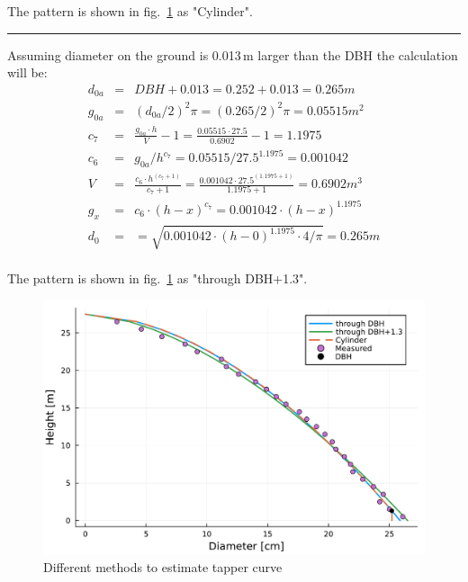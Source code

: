 \documentclass[twocolumn,10pt]{article}
\begin{document}
The pattern is shown in fig.~\ref{fig:trunk} as "Cylinder".

\par\noindent\rule{\columnwidth}{0.5pt}

Assuming diameter on the ground is 0.013\,m larger than the DBH the calculation
will be:
\begin{eqnarray*}
d_{0a} & = & DBH + 0.013 = 0.252 + 0.013 = 0.265m\\
g_{0a} & = & (d_{0a}/2)^2\pi = (0.265/2)^2\pi = 0.05515m^2\\
c_7 & = & \frac{g_{0a} \cdot h}{V} - 1 = \frac{0.05515 \cdot 27.5}{0.6902} - 1 = 1.1975\\
c_6 & = & g_{0a} / h^{c_7} = 0.05515 / 27.5^{1.1975} = 0.001042\\
V & = & \frac{c_6 \cdot h^{(c_7 + 1)}}{c_7 + 1} = 
\frac{0.001042 \cdot 27.5^{(1.1975 + 1)}}{1.1975 + 1} = 0.6902m^3\\
g_x & = & c_6 \cdot (h - x)^{c_7} = 0.001042 \cdot (h - x)^{1.1975}\\
d_0 & = & = \sqrt{0.001042 \cdot (h - 0)^{1.1975} \cdot 4/\pi} = 0.265m\\
\end{eqnarray*}

The pattern is shown in fig.~\ref{fig:trunk} as "through DBH+1.3".

\begin{figure}[htb]
    \includegraphics[width=\columnwidth]{trunk}
    \caption{Different methods to estimate tapper curve}
    \label{fig:trunk}
\end{figure}




\end{document}
